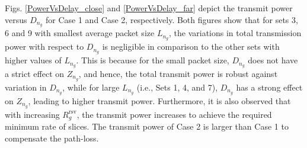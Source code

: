 \documentclass[journal,draftclsnofoot,12pt,onecolumn]{IEEEtran}
\begin{document}
Figs. \ref{PowerVsDelay_close} and \ref{PowerVsDelay_far} depict the transmit power versus ${D}_{n_g}$ for Case 1 and Case 2, respectively. Both figures show that for sets 3, 6 and 9 with smallest average packet size ${L}_{n_g}$, the variations in total transmission power with respect to $ {D}_{n_g}$ is negligible in comparison to the other sets with higher values of $ {L}_{n_g}$. This is because for the small packet size, ${D}_{n_g}$ does not have a strict effect on $Z_{n_g}$, and hence, the total transmit power is robust against variation in ${D}_{n_g}$, while for large ${L}_{n_g}$ (i.e., Sets 1, 4, and 7), ${D}_{n_g}$ has a strong effect on $Z_{n_g}$, leading to higher transmit power. Furthermore, it is also observed that with increasing $R_g^\text{rsv}$, the transmit power increases to achieve the required minimum rate of slices. The transmit power of Case 2 is larger than Case 1 to compensate the path-loss.




\end{document}
